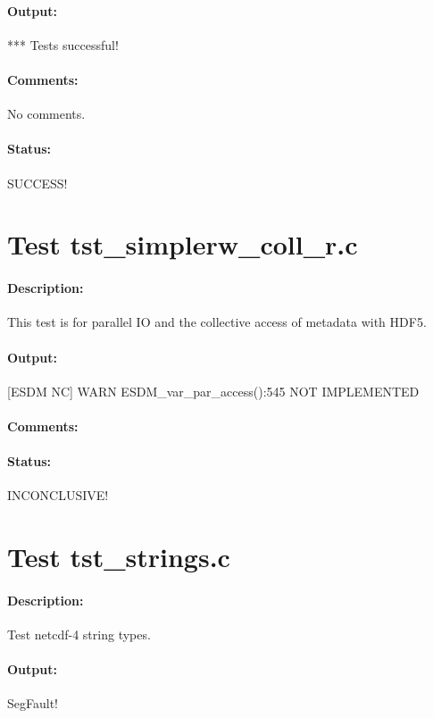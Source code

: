 \paragraph{Output:} *** Tests successful!

\paragraph{Comments:} No comments.

\paragraph{Status:} SUCCESS!

\section{Test tst\_simplerw\_coll\_r.c}

\paragraph{Description:} This test is for parallel IO and the collective access of metadata with HDF5.

\paragraph{Output:} [ESDM NC] WARN ESDM\_var\_par\_access():545 NOT IMPLEMENTED

\paragraph{Comments:}

\paragraph{Status:} INCONCLUSIVE!

\section{Test tst\_strings.c}

\paragraph{Description:} Test netcdf-4 string types.

\paragraph{Output:} SegFault!

